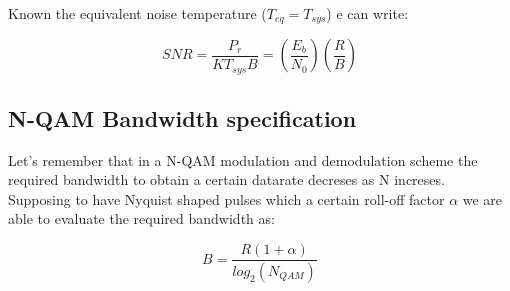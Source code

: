 Known the equivalent noise temperature ($T_{eq}=T_{sys}$) e can write:

\begin{equation}	
SNR = \frac{P_r}{KT_{sys}B}=\left(\frac{E_b}{N_0}\right)\left(\frac{R}{B}\right)
\end{equation}


\subsection{N-QAM Bandwidth specification} %
\label{sub:n_qam}

Let's remember that in a N-QAM modulation and demodulation scheme the required bandwidth to obtain a certain datarate decreses as N increses.
Supposing to have Nyquist shaped pulses which a certain roll-off factor $\alpha$ we are able to evaluate the required bandwidth as:

\begin{equation}
	B= \frac {R(1+ \alpha)} {log_2(N_{QAM})}
\end{equation}





